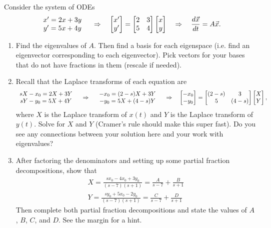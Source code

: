 \begin{problem}
 Consider the system of ODEs
$$
\begin{array}{c}
 x' = 2x+3y\\
 y' = 5x+4y
\end{array}
\quad\Rightarrow\quad
\begin{bmatrix} x'\\y' \end{bmatrix} =\begin{bmatrix} 2&3\\5&4 \end{bmatrix}\begin{bmatrix} x\\y \end{bmatrix} 
\quad\Rightarrow\quad
\dfrac{d\vec{x}}{dt} =A\vec x. 
$$
\begin{enumerate}
 \item Find the eigenvalues of $A$. Then find a basis for each eigenspace (i.e. find an eigenvector corresponding to each eigenvector). Pick vectors for your bases that do not have fractions in them (rescale if needed).
 \item Recall that the Laplace transforms of each equation are
$$
\begin{array}{c}
 sX-x_0 = 2X+3Y\\
 sY-y_0 = 5X+4Y
\end{array}
\quad\Rightarrow\quad
\begin{array}{c}
 -x_0 = (2-s)X+3Y\\
 -y_0 = 5X+(4-s)Y
\end{array}
\quad\Rightarrow\quad
 \begin{bmatrix} -x_0\\-y_0 \end{bmatrix} = \begin{bmatrix} (2-s)&3\\5&(4-s) \end{bmatrix}\begin{bmatrix} X\\Y \end{bmatrix}
,
$$
where $X$ is the Laplace transform of $x(t)$ and $Y$ is the Laplace transform of $y(t)$. 
Solve for $X$ and $Y$ (Cramer's rule should make this super fast). Do you see any connections between your solution here and your work with eigenvalues?
\item 
{}%
After factoring the denominators and setting up some partial fraction decompositions, show that 
\begin{align*}
X=\frac{sx_0-4x_0+3y_0}{(s-7)(s+1)}  = \frac{A}{s-7}+\frac{B}{s+1}\\
Y=\frac{sy_0+5x_0-2y_0}{(s-7)(s+1)}  = \frac{C}{s-7}+\frac{D}{s+1}
\end{align*}
Then complete both partial fraction decompositions and state the values of $A$, $B$, $C$, and $D$. See the margin for a hint. 

\end{enumerate}
\end{problem}
